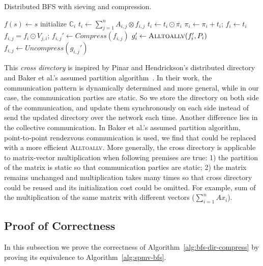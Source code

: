 \documentclass[conference]{IEEEtran}
\begin{document}
\begin{algorithm} [t] \label{alg:bfs-dir-compress}
\caption{Distributed BFS with sieving and compression.}
$f(s) \gets s$\;
initialize $\mathbb{C}_i$\;
{
  {
    $t_{i} \gets \sum_{j=1}^{n} A_{i,j} \otimes f_{i,j} $\;
    $t_{i} \gets t_{i} \odot \overline{\pi_{i}}$\;
    $\pi_{i} \gets \pi_{i} + t_{i}$; $f_{i} \gets t_{i}$\;
    \ForEach{$j \in [0,n)$ in parallel}
    {
      $f_{i,j} = f_i \odot V_{j,i}$;\;
      $f_{i,j}' \gets Compress(f_{i,j})$\;
    }
    $g_i' \gets \textsc{Alltoallv}(f_i',P_i)$\;
    \ForEach{$j \in [0,n)$ in parallel}
    {
      $f_{i,j} \gets Uncompress(g_{i,j}')$\;
    }
  }
}
\end{algorithm}

This \textit{cross directory} is inspired by Pinar and Hendrickson's
distributed directory~\cite{Pinar:2001} and Baker et al.'s assumed partition
algorithm~\cite{Baker:2006}. In their work, the communication pattern is
dynamically determined and more general, while in our case, the communication
parties are static. So we store the directory on both side of the
communication, and update them synchronously on each side instead of send the
updated directory over the network each time.  Another difference lies in the
collective communication. In Baker et al.'s assumed partition algorithm,
point-to-point rendezvous communication is used, we find that could be
replaced with a more efficient \textsc{Alltoallv}. More generally, the cross
directory is applicable to matrix-vector multiplication when following
premises are true: 1) the partition of the matrix is static so that
communication parties are static; 2) the matrix remains unchanged and
multiplication takes many times so that cross directory could be reused and
its initialization cost could be omitted. For example, sum of the
multiplication of the same matrix with different vectors
($\sum_{i=1}^{n}Ax_i$).

\subsection{Proof of Correctness}
\label{sec:prof-correct}

In this subsection we prove the correctness of
Algorithm~\ref{alg:bfs-dir-compress} by proving its equivalence to
Algorithm~\ref{alg:spmv-bfs}.
\end{document}

